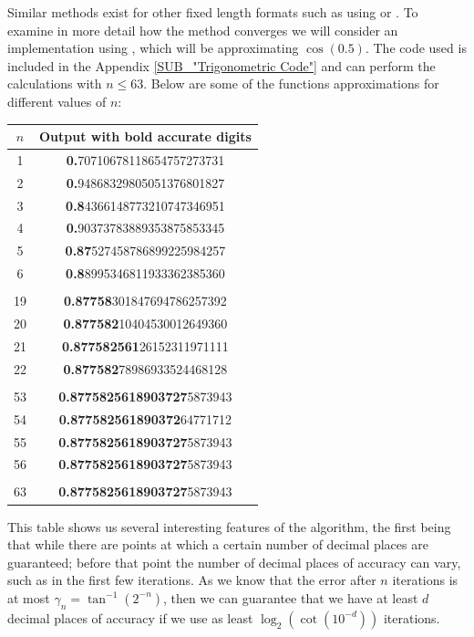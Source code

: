 {Similar methods exist for other fixed length formats such as using  or . To examine in more detail how the method converges we will consider an implementation using , which will be approximating \(\cos(0.5)\). The code used is included in the Appendix \ref{SUB_"Trigonometric Code"} and can perform the calculations with \(n \le 63\). Below are some of the functions approximations for different values of \(n\):

{\selectfont
\begin{center}
\begin{tabular}{|c|c|}
	\hline
	\(n\) & \textsf{Output with bold accurate digits}\\\hline
	1 & \textbf{0.}70710678118654757273731\\\hline
	2 & \textbf{0.}94868329805051376801827\\\hline
	3 & \textbf{0.8}4366148773210747346951\\\hline
	4 & \textbf{0.}90373783889353875853345\\\hline
	5 & \textbf{0.87}527458786899225984257\\\hline
	6 & \textbf{0.8}8995346811933362385360\\\hline
	\cdots & \cdots\\\hline
	19 & \textbf{0.87758}301847694786257392\\\hline
	20 & \textbf{0.877582}10404530012649360\\\hline
	21 & \textbf{0.877582561}26152311971111\\\hline
	22 & \textbf{0.877582}78986933524468128\\\hline
	\cdots & \cdots\\\hline
	53 & \textbf{0.8775825618903727}5873943\\\hline
	54 & \textbf{0.877582561890372}64771712\\\hline
	55 & \textbf{0.8775825618903727}5873943\\\hline
	56 & \textbf{0.8775825618903727}5873943\\\hline
	\cdots & \cdots\\\hline
	63 & \textbf{0.8775825618903727}5873943\\\hline
\end{tabular}
\end{center}}

This table shows us several interesting features of the algorithm, the first being that while there are points at which a certain number of decimal places are guaranteed; before that point the number of decimal places of accuracy can vary, such as in the first few iterations. As we know that the error after \(n\) iterations is at most \(\gamma_n = \tan^{-1}(2^{-n})\), then we can guarantee that we have at least \(d\) decimal places of accuracy if we use as least \(\log_2(\cot(10^{-d}))\) iterations.\\

}
